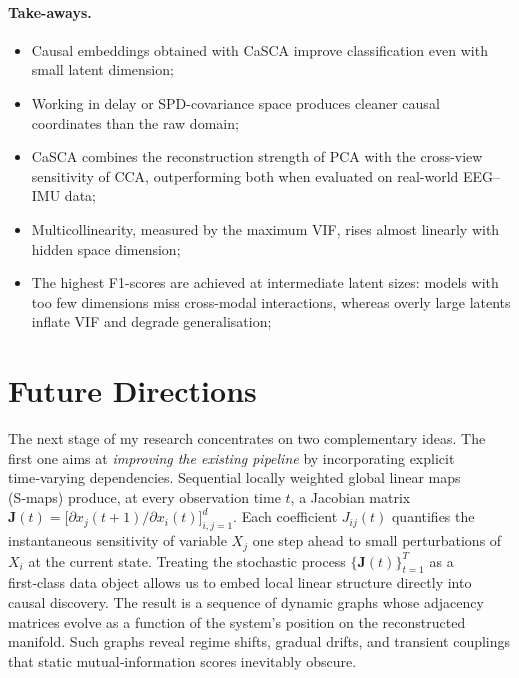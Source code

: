 \documentclass[14pt]{extarticle}
\begin{document}
	\paragraph{Take-aways.}
	\begin{itemize}
		\item Causal embeddings obtained with CaSCA improve classification even with small latent dimension;
		\item Working in delay or SPD-covariance space produces cleaner causal
		coordinates than the raw domain;
		\item CaSCA combines the reconstruction strength of PCA with the
		cross-view sensitivity of CCA, outperforming both when evaluated on
		real-world EEG–IMU data;
		\item Multicollinearity, measured by the maximum VIF, rises almost linearly with hidden space dimension;
		\item The highest F1-scores are achieved at intermediate latent sizes: models with too few dimensions miss cross-modal interactions, whereas overly large latents inflate VIF and degrade generalisation;
	\end{itemize}
	
%	
	
	\section{Future Directions} \label{sec:future}
	
	The next stage of my research concentrates on two complementary ideas.  
	The first one aims at \emph{improving the existing pipeline} by incorporating explicit time‑varying dependencies.  
	Sequential locally weighted global linear maps (S‑maps) produce, at every observation time $t$, a Jacobian matrix $\mathbf J(t)=\bigl[\partial x_j(t+1)\!/\!\partial x_i(t)\bigr]_{i,j=1}^{d}$.  
	Each coefficient $J_{ij}(t)$ quantifies the instantaneous sensitivity of variable $X_j$ one step ahead to small perturbations of $X_i$ at the current state.  
	Treating the stochastic process $\{\mathbf J(t)\}_{t=1}^{T}$ as a first‑class data object allows us to embed local linear structure directly into causal discovery.   
	The result is a sequence of dynamic graphs whose adjacency matrices evolve as a function of the system’s position on the reconstructed manifold.  
	Such graphs reveal regime shifts, gradual drifts, and transient couplings that static mutual‑information scores inevitably obscure.  
	
\end{document}
